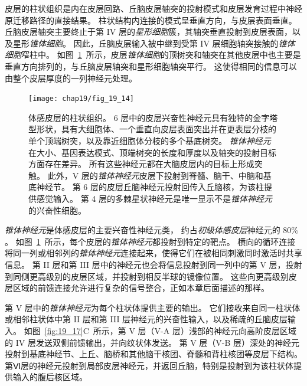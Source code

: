 皮层的柱状组织是内在皮层回路、丘脑皮层轴突的投射模式和皮层发育过程中神经原迁移路径的直接结果。
柱状结构内连接的模式呈垂直方向，与皮层表面垂直。
丘脑皮层轴突主要终止于第 IV 层的\textit{星形细胞}簇，其轴突垂直投射到皮层表面，以及星形\textit{锥体细胞}。
因此，丘脑皮层输入被中继到受第 IV 层细胞轴突接触的\textit{锥体细胞}窄柱中。
如图~\ref{fig:19_14}~所示，皮层\textit{锥体细胞}的顶树突和轴突在其他皮层中也主要是垂直方向排列的，与丘脑皮层轴突和星形细胞轴突平行。
这使得相同的信息可以由整个皮层厚度的一列神经元处理。


\begin{figure}[htbp]
	\centering
	\texttt{[image: chap19/fig\_19\_14]}
	\caption{体感皮层的柱状组织。
		6 层中的皮层兴奋性神经元具有独特的金字塔型形状，具有大细胞体、一个垂直向皮层表面突出并在更表层分枝的单个顶端树突，以及靠近细胞体分枝的多个基底树突。
		\textit{锥体神经元}在大小、基因表达模式、顶端树突的长度和厚度以及轴突的投射目标方面存在差异。
		所有这些神经元都在大脑皮层内的目标上形成突触。
		此外，V 层的\textit{锥体神经元}皮层下投射到脊髓、脑干、中脑和基底神经节。
		第 6 层的皮层丘脑神经元投射回传入丘脑核，为该柱提供感觉输入。
		第 4 层的多棘星状神经元是唯一显示不是\textit{锥体神经元}的兴奋性细胞\cite{oberlaender2012cell}。}
	\label{fig:19_14}
\end{figure}


\textit{锥体神经元}是体感皮层的主要兴奋性神经元类，
约占\textit{初级体感皮层}神经元的 80\% 。 
如图~\ref{fig:19_14}~所示，每个皮层的\textit{锥体神经元}都投射到特定的靶点。
横向的循环连接将同一列或相邻列的\textit{锥体神经元}连接起来，使得它们在被相同刺激同时激活时共享信息。
第 II 层和第 III 层中的神经元也会将信息投射到同一列中的第 V 层，投射到同侧更高级别的皮层区域，并投射到相反半球的镜像位置。
这些向更高级别皮层区域的前馈连接允许进行复杂的信号整合，正如本章后面描述的那样。


第 V 层中的\textit{锥体神经元}为每个柱状体提供主要的输出。
它们接收来自同一柱状体或相邻柱状体中第 II 层和第 III 层神经元的兴奋性输入，以及稀疏的丘脑皮层输入。
如图~\ref{fig:19_17}C~所示，第 V 层（V-A 层）浅部的神经元向高阶皮层区域的 IV 层发送双侧前馈输出，并向纹状体发送。
第 V 层（V-B 层）深处的神经元投射到基底神经节、上丘、脑桥和其他脑干核团、脊髓和背柱核团等皮层下结构。
第Ⅵ层的神经元投射到局部皮层神经元，并返回丘脑，特别是投射到为该柱状体提供输入的腹后核区域。


